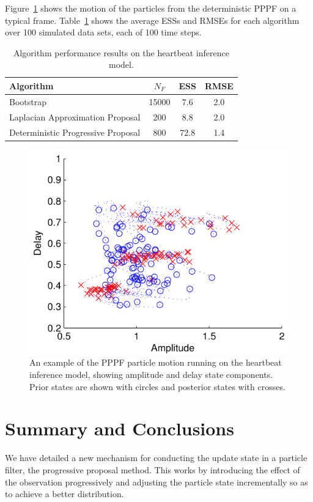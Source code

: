 \documentclass{article}
\begin{document}
Figure~\ref{fig:sineha_example_frame} shows the motion of the particles from the deterministic PPPF on a typical frame. Table~\ref{tab:sineha_results} shows the average ESSs and RMSEs for each algorithm over 100 simulated data sets, each of 100 time steps.
%
\begin{table}
\centering
\begin{tabular}{l||c|c|c}
Algorithm                                & $N_F$ & ESS  & RMSE \\
\hline
Bootstrap                                & 15000 &  7.6 &  2.0 \\
Laplacian Approximation Proposal         &   200 &  8.8 &  2.0 \\
Deterministic Progressive Proposal       &   800 & 72.8 &  1.4 \\
\end{tabular}
\caption{Algorithm performance results on the heartbeat inference model.}
\label{tab:sineha_results}
\end{table}
%
\begin{figure}
\centering
\includegraphics[width=0.7\columnwidth]{sineha_example_frame.pdf}
\caption{An example of the PPPF particle motion running on the heartbeat inference model, showing amplitude and delay state components. Prior states are shown with circles and posterior states with crosses.}
\label{fig:sineha_example_frame}
\end{figure}



\section{Summary and Conclusions}

We have detailed a new mechanism for conducting the update state in a particle filter, the progressive proposal method. This works by introducing the effect of the observation progressively and adjusting the particle state incrementally so as to achieve a better distribution.
\end{document}
